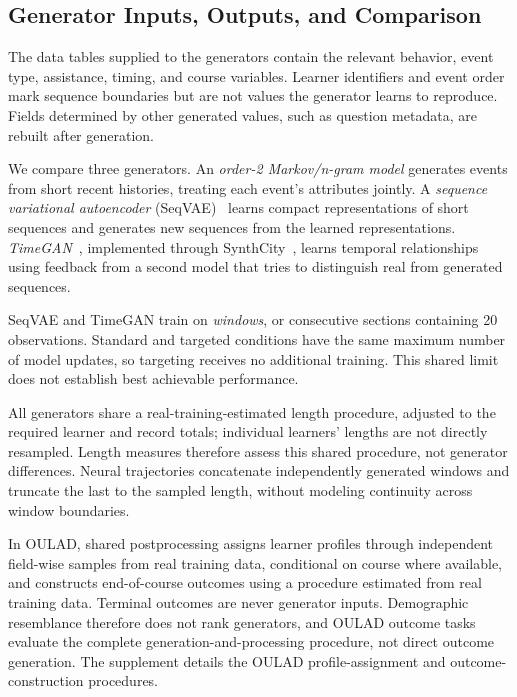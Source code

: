 \documentclass[fleqn,10pt]{JLA_article}
\begin{document}
\subsection{Generator Inputs, Outputs, and Comparison}
\label{sec:generator-inputs}

The data tables supplied to the generators contain the relevant behavior, event type, assistance, timing, and course variables. Learner identifiers and event order mark sequence boundaries but are not values the generator learns to reproduce. Fields determined by other generated values, such as question metadata, are rebuilt after generation.

We compare three generators. An \emph{order-2 Markov/n-gram model} generates events from short recent histories, treating each event's attributes jointly. A \emph{sequence variational autoencoder} (SeqVAE)~\cite{kingma2014autoencoding} learns compact representations of short sequences and generates new sequences from the learned representations. \emph{TimeGAN}~\cite{yoon2019timegan}, implemented through SynthCity~\cite{qian2023synthcity}, learns temporal relationships using feedback from a second model that tries to distinguish real from generated sequences.

SeqVAE and TimeGAN train on \emph{windows}, or consecutive sections containing 20 observations. Standard and targeted conditions have the same maximum number of model updates, so targeting receives no additional training. This shared limit does not establish best achievable performance.

All generators share a real-training-estimated length procedure, adjusted to the required learner and record totals; individual learners' lengths are not directly resampled. Length measures therefore assess this shared procedure, not generator differences. Neural trajectories concatenate independently generated windows and truncate the last to the sampled length, without modeling continuity across window boundaries.

In OULAD, shared postprocessing assigns learner profiles through independent field-wise samples from real training data, conditional on course where available, and constructs end-of-course outcomes using a procedure estimated from real training data. Terminal outcomes are never generator inputs. Demographic resemblance therefore does not rank generators, and OULAD outcome tasks evaluate the complete generation-and-processing procedure, not direct outcome generation. The supplement details the OULAD profile-assignment and outcome-construction procedures.
\end{document}
